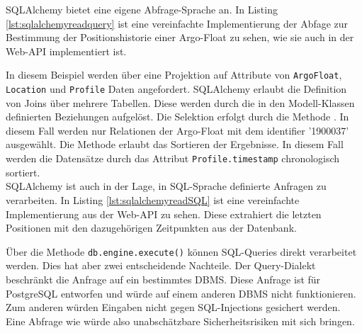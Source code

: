 SQLAlchemy bietet eine eigene Abfrage-Sprache an. In Listing \ref{lst:sqlalchemyreadquery} ist eine vereinfachte Implementierung der Abfage zur Bestimmung der Positionshistorie einer Argo-Float zu sehen, wie sie auch in der Web-API implementiert ist.



In diesem Beispiel werden über eine Projektion auf Attribute von \texttt{ArgoFloat}, \texttt{Location} und \texttt{Profile} Daten angefordert. SQLAlchemy erlaubt die Definition von Joins über mehrere Tabellen. Diese werden durch die in den Modell-Klassen definierten Beziehungen aufgelöst. Die Selektion erfolgt durch die Methode . In diesem Fall werden nur Relationen der Argo-Float mit dem identifier '1900037' ausgewählt. Die Methode  erlaubt das Sortieren der Ergebnisse. In diesem Fall werden die Datensätze durch das Attribut \texttt{Profile.timestamp} chronologisch sortiert.
\\

SQLAlchemy ist auch in der Lage, in SQL-Sprache definierte Anfragen zu verarbeiten. In Listing \ref{lst:sqlalchemyreadSQL} ist eine vereinfachte Implementierung aus der Web-API zu sehen. Diese extrahiert die letzten Positionen mit den dazugehörigen Zeitpunkten aus der Datenbank.


Über die Methode \texttt{db.engine.execute()} können SQL-Queries direkt verarbeitet werden. Dies hat aber zwei entscheidende Nachteile. Der Query-Dialekt beschränkt die Anfrage auf ein bestimmtes DBMS. Diese Anfrage ist für PostgreSQL entworfen und würde auf einem anderen DBMS nicht funktionieren. Zum anderen würden Eingaben nicht gegen SQL-Injections gesichert werden. Eine Abfrage wie
 würde also unabschätzbare Sicherheitsrisiken mit sich bringen.
\\




